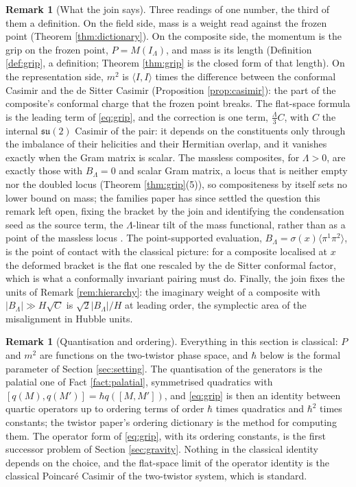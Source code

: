 \documentclass[11pt]{article}
\theoremstyle{definition}
\newtheorem{remark}[theorem]{Remark}
\newcommand{\ip}[2]{\langle #1, #2\rangle}
\newcommand{\br}[1]{\langle #1\rangle}
\begin{document}
\begin{remark}[What the join says]\label{rem:join}
Three readings of one number, the third of them a definition. On the field side, mass is a weight read against the frozen point (Theorem \ref{thm:dictionary}). On the composite side, the momentum is the grip on the frozen point, $P = M(I_{\Lambda})$, and mass is its length (Definition \ref{def:grip}, a definition; Theorem \ref{thm:grip} is the closed form of that length). On the representation side, $m^{2}$ is $\ip{I}{I}$ times the difference between the conformal Casimir and the de Sitter Casimir (Proposition \ref{prop:casimir}): the part of the composite's conformal charge that the frozen point breaks. The flat-space formula is the leading term of \eqref{eq:grip}, and the correction is one term, $\tfrac{\Lambda}{3}C$, with $C$ the internal $\mathfrak{su}(2)$ Casimir of the pair: it depends on the constituents only through the imbalance of their helicities and their Hermitian overlap, and it vanishes exactly when the Gram matrix is scalar. The massless composites, for $\Lambda > 0$, are exactly those with $B_{\Lambda} = 0$ and scalar Gram matrix, a locus that is neither empty nor the doubled locus (Theorem \ref{thm:grip}(5)), so compositeness by itself sets no lower bound on mass; the families paper has since settled the question this remark left open, fixing the bracket by the join and identifying the condensation seed as the source term, the $\Lambda$-linear tilt of the mass functional, rather than as a point of the massless locus \cite[Props.~4.1-4.2]{ButlerT13}. The point-supported evaluation, $B_{\Lambda} = \sigma(x)\br{\pi^{1}\pi^{2}}$, is the point of contact with the classical picture: for a composite localised at $x$ the deformed bracket is the flat one rescaled by the de Sitter conformal factor, which is what a conformally invariant pairing must do. Finally, the join fixes the units of Remark \ref{rem:hierarchy}: the imaginary weight of a composite with $|B_{\Lambda}| \gg H\sqrt{C}$ is $\sqrt{2}|B_{\Lambda}|/H$ at leading order, the symplectic area of the misalignment in Hubble units.
\end{remark}

\begin{remark}[Quantisation and ordering]\label{rem:quantum}
Everything in this section is classical: $P$ and $m^{2}$ are functions on the two-twistor phase space, and $\hbar$ below is the formal parameter of Section \ref{sec:setting}. The quantisation of the generators is the palatial one of Fact \ref{fact:palatial}, symmetrised quadratics with $[q(M), q(M')] = \hbar q([M,M'])$, and \eqref{eq:grip} is then an identity between quartic operators up to ordering terms of order $\hbar$ times quadratics and $\hbar^{2}$ times constants; the twistor paper's ordering dictionary \cite[Thm.~5.7]{ButlerT9} is the method for computing them. The operator form of \eqref{eq:grip}, with its ordering constants, is the first successor problem of Section \ref{sec:gravity}. Nothing in the classical identity depends on the choice, and the flat-space limit of the operator identity is the classical Poincar\'e Casimir of the two-twistor system, which is standard.
\end{remark}
\end{document}
